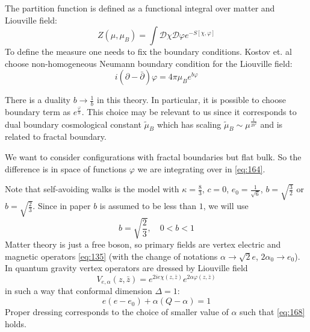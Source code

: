 \documentclass[12pt]{article}
\begin{document}
The partition function is defined as a functional integral over matter and Liouville field:
\begin{equation}
  \label{eq:164}
  Z(\mu,\mu_{B})=\int \mathcal{D}\chi \mathcal{D}\varphi e^{-S[\chi,\varphi]}
\end{equation}
To define the measure one needs to fix the boundary conditions. Kostov et. al choose non-homogeneous
Neumann boundary condition for the Liouville field:
\begin{equation}
  \label{eq:165}
  i(\partial -\bar\partial)\varphi=4\pi\mu_{B}e^{b\varphi}
\end{equation}

There is a duality $b\to \frac{1}{b}$ in this theory. In particular, it is possible to choose
boundary term as $e^{\frac{\varphi}{b}}$. This choice may be relevant to us since it corresponds to
dual boundary cosmological constant $\tilde\mu_{B}$ which has scaling $\tilde\mu_{B}\sim
\mu^{\frac{1}{2b^{2}}}$ and is related to fractal boundary. 

We want to consider configurations with fractal boundaries but flat bulk. So the difference is in
space of functions $\varphi$ we are integrating over in \eqref{eq:164}. 

Note that self-avoiding walks is the model with $\kappa=\frac{8}{3}$, $c=0$,
$e_{0}=\frac{1}{\sqrt{6}}$, $b=\sqrt{\frac{3}{2}}$ or $b=\sqrt{\frac{2}{3}}$. Since in paper
\cite{kostov2004boundary} $b$ is assumed to be less than $1$, we will use
\begin{equation}
  \label{eq:166}
  b=\sqrt{\frac{2}{3}}, \quad 0<b<1
\end{equation}
Matter theory is just a free boson, so primary fields are vertex electric and magnetic operators
\eqref{eq:135} (with the change of notations $\alpha\to \sqrt{2} e$, $2\alpha_{0}\to  e_{0}$). In
quantum gravity vertex operators are dressed by Liouville field
\begin{equation}
  \label{eq:167}
  V_{e,\alpha}(z,\bar z)=e^{2ie\chi(z,\bar z)} e^{2\alpha\varphi(z,\bar z)}
\end{equation}
in such a way that conformal dimension $\Delta=1$:
\begin{equation}
  \label{eq:168}
  e(e-e_{0})+\alpha(Q-\alpha)=1
\end{equation}
Proper dressing corresponds to the choice of smaller value of $\alpha$ such that \eqref{eq:168}
holds. 
\end{document}
